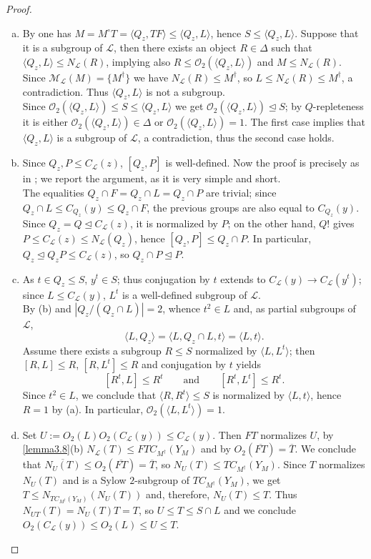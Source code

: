 \documentclass{amsart}
\numberwithin{equation}{section}
\theoremstyle{definition}
\theoremstyle{subresult}
\theoremstyle{caseresult}
\newcommand{\M}{\mathcal{M}}
\renewcommand{\L}{\mathcal{L}}
\newcommand{\coll}{\mathcal{O}}
\newcommand{\ov}{\overline}
\newcommand{\norm}{\trianglelefteq}
\newcommand{\fto}{\longrightarrow}
\newcommand{\<}{\langle}
\renewcommand{\>}{\rangle}
\begin{document}
\begin{proof}
	\begin{enumerate}[(a)]
		\item By \cite[Lemma 3.4(b) and (i)]{Meier-Stell-Stroth:2012} one has $M = M^\circ T = \<Q_z,TF \> \le \<Q_z, L \>$, hence $S \le \<Q_z, L \>$. Suppose that it is a subgroup of $\L$, then there exists an object $R \in \Delta$ such that $\<Q_z,L\> \le N_\L(R)$, implying also $R \le \coll_2(\<Q_z,L\>)$ and $M \le N_\L(R)$. Since $\M_\L(M) = \{M^\dagger \}$ we have $N_\L(R) \le M^\dagger$, so $L \le N_\L(R) \le M^\dagger$, a contradiction. Thus $\<Q_z, L\>$ is not a subgroup.\\
		Since $\coll_2(\<Q_z,L\>) \le S \le \<Q_z,L\>$ we get $\coll_2(\<Q_z,L\>) \norm S$; by $Q$-repleteness it is either $\coll_2(\<Q_z,L\>) \in \Delta$ or $\coll_2(\<Q_z,L\>)=1$. The first case implies that $\<Q_z,L\>$ is a subgroup of $\L$, a contradiction, thus the second case holds.
		\item Since $Q_z,P \le C_\L(z)$, $[Q_z,P]$ is well-defined. Now the proof is precisely as in \cite[Lemma 3.10(b)]{Meier-Stell-Stroth:2012}; we report the argument, as it is very simple and short.\\
		The equalities $Q_z \cap F = Q_z \cap L = Q_z \cap P$ are trivial; since $Q_z \cap L \le C_{Q_z}(y) \le Q_z \cap F$, the previous groups are also equal to $C_{Q_z}(y)$.\\
		Since $Q_z=Q \norm C_\L(z)$, it is normalized by $P$; on the other hand, $Q!$ gives $P \le C_\L(z) \le N_\L(Q_z)$, hence $[Q_z,P] \le Q_z \cap P$. In particular, $Q_z \norm Q_zP \le C_\L(z)$, so $Q_z \cap P \norm P$. 
		\item As $t \in Q_z \le S$, $y^t \in S$; thus conjugation by $t$ extends to $C_\L(y) \fto C_\L(y^t)$; since $L \le C_\L(y)$, $L^t$ is a well-defined subgroup of $\L$.\\
		By (b) and \cite[Lemma 3.4(a)]{Meier-Stell-Stroth:2012} $|Q_z/(Q_z \cap L)|=2$, whence $t^2 \in L$ and, as partial subgroups of $\L$,
		\[
		\<L,Q_z\> = \<L,Q_z \cap L,t \> = \< L,t \>.
		\]
		Assume there exists a subgroup $R \le S$ normalized by $\<L,L^t\>$; then $[R,L] \le R$, $[R,L^t]\le R$ and conjugation by $t$ yields
		\[
		[R^t,L] \le R^t \qquad \text{and} \qquad [R^t,L^t] \le R^t.
		\]
		Since $t^2 \in L$, we conclude that $\<R,R^t\> \le S$ is normalized by $\<L,t\>$, hence $R=1$ by (a). In particular, $\coll_2(\<L,L^t\>)=1$.
		\item Set $U := O_2(L)O_2(C_\L(y)) \le C_\L(y)$. Then $FT$ normalizes $U$, by \ref{lemma3.8}(b) $N_\L(T) \le FTC_{M^\dagger}(Y_M)$ and by \cite[Lemma 3.4(c)]{Meier-Stell-Stroth:2012} $O_2(\ov{FT}) = \ov{T}$. We conclude that $\ov{N_U(T)} \le O_2(\ov{FT}) = \ov{T}$, so $N_U(T) \le TC_{M^\dagger}(Y_M)$. Since $T$ normalizes $N_U(T)$ and is a Sylow $2$-subgroup of $TC_{M^\dagger}(Y_M)$, we get $T \le N_{TC_{M^\dagger}(Y_M)}(N_U(T))$ and, therefore, $N_U(T) \le T$. Thus $N_{UT}(T) = N_U(T)T = T$, so $U \le T \le S \cap L$ and we conclude $O_2(C_\L(y)) \le O_2(L) \le U \le T$.

\end{enumerate}
\end{proof}
\end{document}
